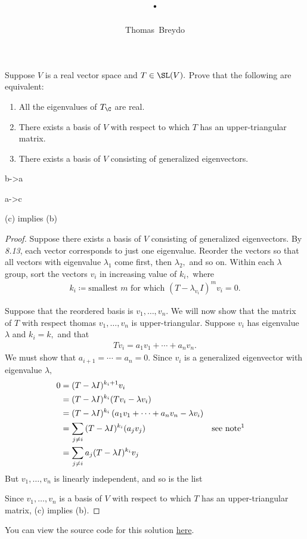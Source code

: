 \documentclass{amsart}
\title{\pagenum.\probnum}
\author{Thomas\ Breydo}
\newcommand{\pagenum}{286}
\newcommand{\probnum}{18}
\begin{document}
\maketitle

\begin{problem*}
Suppose $V$ is a real vector space and $T\in\SL(V).$ Prove that the
following are equivalent:
\begin{enumerate}[label=(\alph*)]
    \item All the eigenvalues of $T_\C$ are real.
    \item There exists a basis of $V$ with respect to which
        $T$ has an upper-triangular matrix.
    \item There exists a basis of $V$ consisting of generalized
        eigenvectors.
\end{enumerate}
\end{problem*}

\vspace{0.5in}

b->a

a->c


\begin{claim*}
(c) implies (b)
\end{claim*}
\begin{proof}
Suppose there exists a basis of $V$ consisting of generalized
eigenvectors. By \textit{8.13}, each vector corresponds to just one eigenvalue.
Reorder the vectors so that all vectors with eigenvalue $\lambda_1$
come first, then $\lambda_2,$ and so on. Within each $\lambda$ group,
sort the vectors $v_i$ in increasing value of $k_i,$ where
\begin{align*}
    k_i\coloneqq\text{smallest }m\text{ for which }(T-\lambda_{v_i} I)^m v_i=0.
\end{align*}

Suppose that the reordered basis is $v_1,\ldots,v_n.$
We will now show that the matrix of $T$ with respect thomas
$v_1,\ldots,v_n$ is upper-triangular. Suppose $v_i$ has eigenvalue
$\lambda$ and $k_i=k,$ and that
\begin{align*}
    Tv_i=a_1v_1+\cdots+a_nv_n.
\end{align*}
We must show that $a_{i+1}=\cdots=a_n=0.$ Since $v_i$ is a generalized
eigenvector with eigenvalue $\lambda,$
\begin{align*}
    0
    &= (T-\lambda I)^{k_i+1}{v_i} \\
    &= (T-\lambda I)^{k_i}(Tv_i-\lambda v_i) \\
    &= (T-\lambda I)^{k_i}\left(a_1v_1+\cdots+a_nv_n-\lambda v_i\right)\\
    &= \sum_{j\ne i}{(T-\lambda I)^{k_i}(a_jv_j)}
        &&\text{see note\footnotemark}\\
    &= \sum_{j\ne i}{a_j(T-\lambda I)^{k_i}v_j}
\end{align*}
But $v_1,\ldots,v_n$ is linearly independent, and so is the list

Since $v_1,\dots,v_n$ is a basis of $V$ with respect to which
$T$ has an upper-triangular matrix, (c) implies (b).
\end{proof}

\vspace{0.5in}

\begin{note*}
You can view the source code for this solution
\href{https://github.com/thomasbreydo/linalg/blob/main/\pagenum_\probnum_Thomas_Breydo.tex}
{here}.
\end{note*}
\end{document}
